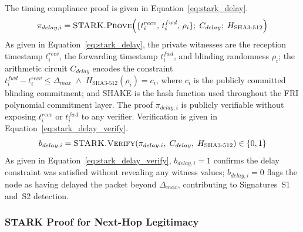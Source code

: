 \documentclass[12pt, a4paper]{report}
\begin{document}
The timing compliance proof is given in
Equation~\eqref{eq:stark_delay}.
\begin{equation}
\pi_{delay,i} = \textsc{STARK.Prove}\!\left(
\{t^{recv}_i,\, t^{fwd}_i,\, \rho_i\};\;
C_{delay};\;
H_{\text{SHA3-512}}
\right)
\label{eq:stark_delay}
\end{equation}
As given in Equation~\eqref{eq:stark_delay}, the
private witnesses are the reception timestamp
$t^{recv}_i$, the forwarding timestamp $t^{fwd}_i$,
and blinding randomness $\rho_i$; the arithmetic
circuit $C_{delay}$ encodes the constraint
$t^{fwd}_i - t^{recv}_i \leq \Delta_{max}
\;\land\; H_{\text{SHA3-512}}(\rho_i) = c_i$,
where $c_i$ is the publicly committed blinding
commitment; and \ac{SHAKE} is the hash function
used throughout the FRI polynomial commitment layer.
The proof $\pi_{delay,i}$ is publicly verifiable
without exposing $t^{recv}_i$ or $t^{fwd}_i$ to
any verifier. Verification is given in
Equation~\eqref{eq:stark_delay_verify}.
\begin{equation}
b_{delay,i} = \textsc{STARK.Verify}\!\left(
\pi_{delay,i},\; C_{delay},\;
H_{\text{SHA3-512}}
\right) \in \{0, 1\}
\label{eq:stark_delay_verify}
\end{equation}
As given in Equation~\eqref{eq:stark_delay_verify},
$b_{delay,i} = 1$ confirms the delay constraint was
satisfied without revealing any witness values;
$b_{delay,i} = 0$ flags the node as having delayed
the packet beyond $\Delta_{max}$, contributing to
Signatures~S1 and~S2 detection.


\subsubsection{STARK Proof for Next-Hop Legitimacy}
\end{document}
